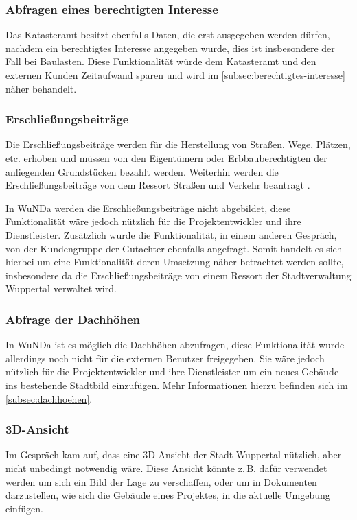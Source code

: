  
\subsubsection{Abfragen eines berechtigten Interesse}
Das Katasteramt besitzt ebenfalls Daten, die erst ausgegeben werden dürfen, nachdem ein berechtigtes Interesse angegeben wurde, dies ist insbesondere der Fall bei Baulasten.
Diese Funktionalität würde dem Katasteramt und den externen Kunden Zeitaufwand sparen und wird im \autoref{subsec:berechtigtes-interesse} näher behandelt.

\subsubsection{Erschließungsbeiträge}
Die Erschließungsbeiträge werden für die Herstellung von Straßen, Wege, Plätzen, etc. erhoben und müssen von den Eigentümern oder Erbbauberechtigten der anliegenden Grundstücken bezahlt werden.
Weiterhin werden die Erschließungsbeiträge von dem Ressort Straßen und Verkehr beantragt \autocite[vgl.][]{wupp-erschliessungsbeitrag}.

In \ac{WuNDa} werden die Erschließungsbeiträge nicht abgebildet, diese Funktionalität wäre jedoch nützlich für die Projektentwickler und ihre Dienstleister.
Zusätzlich wurde die Funktionalität, in einem anderen Gespräch, von der Kundengruppe der Gutachter ebenfalls angefragt.
Somit handelt es sich hierbei um eine Funktionalität deren Umsetzung näher betrachtet werden sollte, insbesondere da die Erschließungsbeiträge von einem Ressort der Stadtverwaltung Wuppertal verwaltet wird.

\subsubsection{Abfrage der Dachhöhen}
In \ac{WuNDa} ist es möglich die Dachhöhen abzufragen, diese Funktionalität wurde allerdings noch nicht für die externen Benutzer freigegeben.
Sie wäre jedoch nützlich für die Projektentwickler und ihre Dienstleister um ein neues Gebäude ins bestehende Stadtbild einzufügen.
Mehr Informationen hierzu befinden sich im \autoref{subsec:dachhoehen}.

\subsubsection{3D-Ansicht}
Im Gespräch kam auf, dass eine 3D-Ansicht der Stadt Wuppertal nützlich, aber nicht unbedingt notwendig wäre.
Diese Ansicht könnte z.\,B. dafür verwendet werden um sich ein Bild der Lage zu verschaffen, oder um in Dokumenten darzustellen, wie sich die Gebäude eines Projektes, in die aktuelle Umgebung einfügen.

